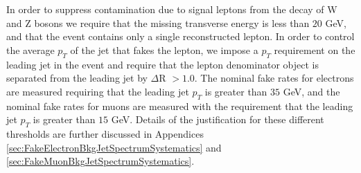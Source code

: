In order to suppress 
contamination due to signal leptons from the decay of W and Z bosons we require
that the missing transverse energy is less than $20$ GeV, and that 
the event contains only a single reconstructed lepton. In order to control the 
average $p_{T}$ of the jet that fakes the lepton, we impose a $p_{T}$ requirement 
on the leading jet in the event and require that the lepton denominator object is 
separated from the leading jet by $\Delta$R $ > 1.0$. The nominal fake rates for
electrons are measured requiring that the leading jet $p_{T}$ is greater than 
$35$ GeV, and the nominal fake rates for muons are measured with the requirement 
that the leading jet $p_{T}$ is greater than $15$ GeV. Details of the justification for
these different thresholds are further discussed in Appendices 
\ref{sec:FakeElectronBkgJetSpectrumSystematics} and 
\ref{sec:FakeMuonBkgJetSpectrumSystematics}.



